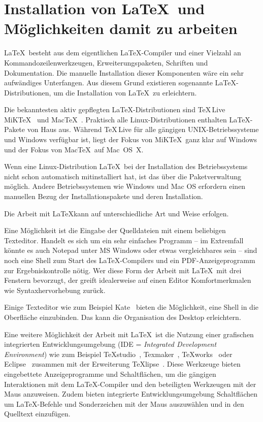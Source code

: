 \documentclass[a4paper,10pt,twoside]{scrbook}
\begin{document}
\section{Installation von \LaTeX\ und Möglichkeiten damit zu arbeiten}
\label{AbschnittInstallation}

\LaTeX\ besteht aus dem eigentlichen \LaTeX-Compiler und einer Vielzahl an Kommandozeilenwerkzeugen, Erweiterungspaketen, Schriften und Dokumentation. Die manuelle Installation dieser Komponenten wäre ein sehr aufwändiges Unterfangen. Aus diesem Grund existieren sogenannte \LaTeX-Distributionen, um die Installation von \LaTeX\ zu erleichtern. 

Die bekanntesten aktiv gepflegten \LaTeX-Distributionen sind \TeX\,Live~\cite{TeXLive_Webpage} MiK\TeX~\cite{MiKTeX_Webpage} und Mac\TeX~\cite{MacTeX_Webpage}. 
Praktisch alle Linux-Distributionen enthalten \LaTeX-Pakete von Haus aus. Während \TeX\,Live für alle gängigen UNIX-Betriebssysteme und Windows verfügbar ist, liegt der Fokus von MiK\TeX\ ganz klar auf Windows und der Fokus von Mac\TeX\ auf Mac~OS~X.

Wenn eine Linux-Distribution \LaTeX\ bei der Installation des Betriebssystems nicht schon automatisch mitinstalliert hat, ist das über die Paketverwaltung möglich. Andere Betriebssystemen wie Windows und Mac OS erfordern einen manuellen Bezug der Installationspakete und deren Installation.

Die Arbeit mit \LaTeX kann auf unterschiedliche Art und Weise erfolgen.

Eine Möglichkeit ist die Eingabe der Quelldateien mit einem beliebigen Texteditor. Handelt es sich um ein sehr einfaches Programm -- im Extremfall könnte es auch Notepad unter MS Windows oder etwas vergleichbares sein -- sind noch eine Shell zum Start des \LaTeX-Compilers und ein PDF-Anzeigeprogramm zur Ergebniskontrolle nötig. Wer diese Form der Arbeit mit \LaTeX\ mit drei Fenstern bevorzugt, der greift idealerweise auf einen Editor Komfortmerkmalen wie Syntaxhervorhebung zurück.

Einige Texteditor wie zum Beispiel Kate~\cite{Katewebpage} bieten die Möglichkeit, eine Shell in die Oberfläche einzubinden. Das kann die Organisation des Desktop erleichtern.

Eine weitere Möglichkeit der Arbeit mit \LaTeX\ ist die Nutzung einer grafischen integrierten Entwicklungsumgebung (IDE = \textsl{Integrated Development Environment}) wie zum Beispiel \TeX studio~\cite{TeXstudioWebseite}, Texmaker~\cite{TeXmakerWebseite}, TeXworks~\cite{TeXworksWebseite} oder Eclipse~\cite{EclipseWebseite} zusammen mit der Erweiterung TeXlipse~\cite{TeXlipseWebseite}. Diese Werkzeuge bieten eingebettete Anzeigeprogramme und Schaltflächen, um die gängigen Interaktionen mit dem \LaTeX-Compiler und den beteiligten Werkzeugen mit der Maus anzuweisen. Zudem bieten integrierte Entwicklungsumgebung Schaltflächen um \LaTeX-Befehle und Sonderzeichen mit der Maus auszuwählen und in den Quelltext einzufügen.
\end{document}
